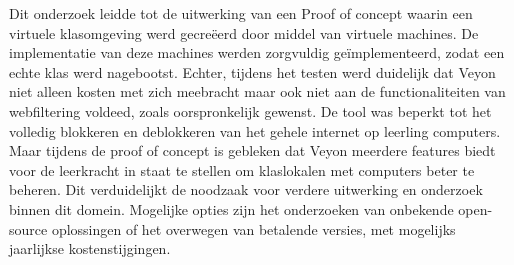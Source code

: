 Dit onderzoek leidde tot de uitwerking van een Proof of concept waarin een virtuele klasomgeving werd gecreëerd door middel van virtuele machines. De implementatie van deze machines werden zorgvuldig geïmplementeerd, zodat een echte klas werd nagebootst. Echter, tijdens het testen werd duidelijk dat Veyon niet alleen kosten met zich meebracht maar ook niet aan de functionaliteiten van webfiltering voldeed, zoals oorspronkelijk gewenst. De tool was beperkt tot het volledig blokkeren en deblokkeren van het gehele internet op leerling computers. Maar tijdens de proof of concept is gebleken dat Veyon meerdere features biedt voor de leerkracht in staat te stellen om klaslokalen met computers beter te beheren. Dit verduidelijkt de noodzaak voor verdere uitwerking en onderzoek binnen dit domein. Mogelijke opties zijn het onderzoeken van onbekende open-source oplossingen of het overwegen van betalende versies, met mogelijks jaarlijkse kostenstijgingen.


